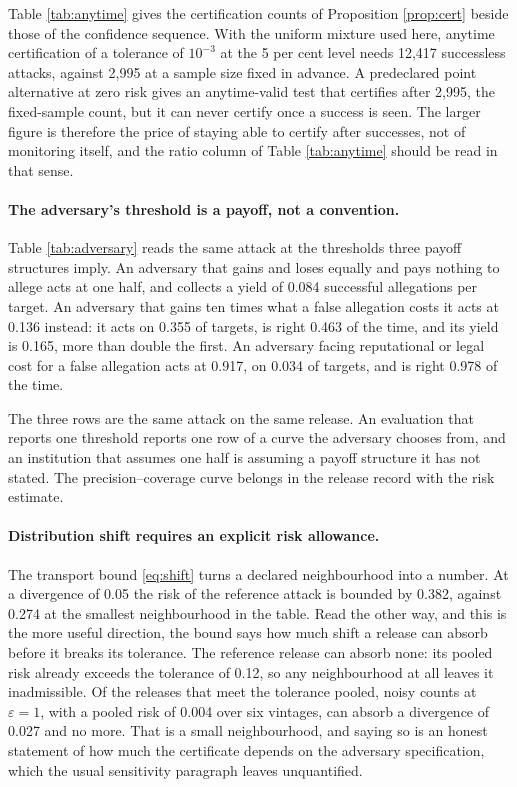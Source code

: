 \documentclass[11pt,a4paper]{article}
\theoremstyle{plain}
\theoremstyle{definition}
\begin{document}


Table \ref{tab:anytime} gives the certification counts of Proposition
\ref{prop:cert} beside those of the confidence sequence. With the uniform
mixture used here, anytime certification of a tolerance of $10^{-3}$ at the 5
per cent level needs 12{,}417 successless attacks, against 2{,}995 at a sample
size fixed in advance. A predeclared point alternative at zero risk gives an
anytime-valid test that certifies after 2{,}995, the fixed-sample count, but it
can never certify once a success is seen. The larger figure is therefore the
price of staying able to certify after successes, not of monitoring itself, and
the ratio column of Table \ref{tab:anytime} should be read in that sense.

\paragraph{The adversary's threshold is a payoff, not a convention.}
Table \ref{tab:adversary} reads the same attack at the thresholds three payoff
structures imply. An adversary that gains and loses equally and pays nothing to
allege acts at one half, and collects a yield of 0.084 successful
allegations per target. An adversary that gains ten times what a false allegation
costs it acts at 0.136 instead: it acts on 0.355 of
targets, is right 0.463 of the time, and its yield is
0.165, more than double the first. An adversary facing reputational or
legal cost for a false allegation acts at 0.917, on
0.034 of targets, and is right 0.978 of the
time.



The three rows are the same attack on the same release. An evaluation that reports
one threshold reports one row of a curve the adversary chooses from, and an
institution that assumes one half is assuming a payoff structure it has not stated.
The precision--coverage curve belongs in the release record with the risk estimate.

\paragraph{Distribution shift requires an explicit risk allowance.}
The transport bound \eqref{eq:shift} turns a declared neighbourhood into a number.
At a divergence of 0.05 the risk of the reference attack is
bounded by 0.382, against 0.274 at the smallest
neighbourhood in the table. Read the other way, and this is the more useful
direction, the bound says how much shift a release can absorb before it breaks its
tolerance. The reference release can absorb none: its pooled risk already exceeds
the tolerance of 0.12, so any neighbourhood at all leaves it inadmissible. Of the
releases that meet the tolerance pooled, noisy counts at $\varepsilon=1$, with a
pooled risk of 0.004 over six vintages, can absorb a divergence of 0.027 and no
more. That is a small neighbourhood, and
saying so is an honest statement of how much the certificate depends on the
adversary specification, which the usual sensitivity paragraph leaves
unquantified.
\end{document}
